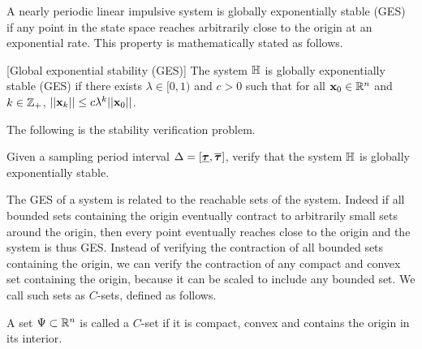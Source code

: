 A nearly periodic linear impulsive system is globally exponentially
stable (GES) if any point in the state space reaches arbitrarily close
to the origin at an exponential rate.  This property is mathematically
stated as follows.
%
\begin{defn}\label{defn:exp-stable}[Global exponential stability (GES)] The
system $\mathbb{H}$ is globally exponentially stable
(GES) if there exists $\lambda\in[0,1)$ and $c>0$ such that for all $\textbf{x}_0
\in\mathbb{R}^n$ and $k\in\mathbb{Z}_+$,
$||\textbf{x}_k||\leq c\lambda^k||\textbf{x}_0||$.
\end{defn}
%
The following is the stability verification problem.
%
\begin{problem}
Given a sampling period interval $\Delta=[\bm{\underline{\tau}},\bm{\overline{\tau}}]$, verify
that the system $\mathbb{H}$ is globally exponentially stable.
\end{problem}
%
The GES of a system is related to the reachable sets of the
system. Indeed if all bounded sets containing the origin eventually
contract to arbitrarily small sets around the origin, then every point
eventually reaches close to the origin and the system is thus GES.
Instead of verifying the contraction of all bounded sets containing
the origin, we can verify the contraction of any compact and convex
set containing the origin, because it can be scaled to include any
bounded set. We call such sets as $C$-sets, defined as follows.
%
\begin{definition}
A set $\Psi\subset\mathbb{R}^n$ is called a $C$-set if it is compact,
convex and contains the origin in its interior.
\end{definition}
%

